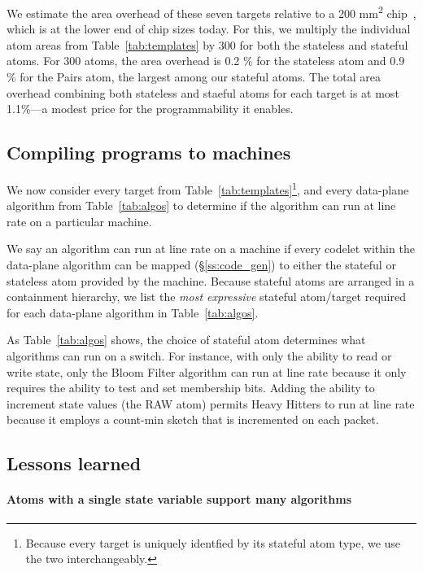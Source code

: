 We estimate the area overhead of these seven targets relative to a 200
\si{\milli\metre\squared} chip~\cite{gibb_parsing}, which is at the lower end
of chip sizes today. For this, we multiply the individual atom areas from
Table~\ref{tab:templates} by 300 for both the stateless and stateful atoms. For
300 atoms, the area overhead is 0.2 \% for the stateless atom and 0.9 \% for
the Pairs atom, the largest among our stateful atoms.  The total area overhead
combining both stateless and staeful atoms for each target is at most 1.1\%---a
modest price for the programmability it enables.

\subsection{Compiling \pktlanguage programs to \absmachine machines}
\label{ss:compiler}
We now consider every target from Table~\ref{tab:templates}\footnote{Because
every target is uniquely identfied by its stateful atom type, we use the two
interchangeably.}, and every data-plane algorithm from Table~\ref{tab:algos} to
determine if the algorithm can run at line rate on a particular \absmachine
machine.

We say an algorithm can run at line rate on a \absmachine machine if every
codelet within the data-plane algorithm can be mapped (\S\ref{ss:code_gen}) to
either the stateful or stateless atom provided by the \absmachine machine.
Because stateful atoms are arranged in a containment hierarchy, we list the
\textit{most expressive} stateful atom/target required for each data-plane
algorithm in Table~\ref{tab:algos}.

As Table~\ref{tab:algos} shows, the choice of stateful atom determines
 what algorithms can run on a switch. For instance, with only the
ability to read or write state, only the Bloom Filter algorithm can run at line
rate because it only requires the ability to test and set membership bits.
Adding the ability to increment state values (the RAW atom) permits Heavy
Hitters to run at line rate because it employs a count-min sketch that is
incremented on each packet.

\subsection{Lessons learned}
\label{ss:lessons}
\paragraph{Atoms with a single state variable support many algorithms}

